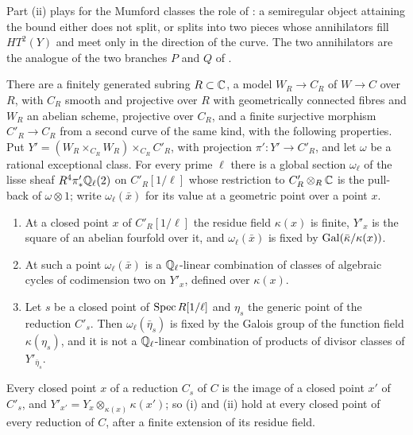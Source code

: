 Part (ii) plays for the Mumford classes the role of : a
semiregular object attaining the bound either does not split, or splits into
two pieces whose annihilators fill $HT^{2}(Y)$ and meet only in the direction
of the curve. The two annihilators are the analogue of the two branches $P$
and $Q$ of .

\begin{proposition}
\label{prop:modp}
There are a finitely generated subring $R\subset\mathbb{C}$, a model $W_{R}\to
C_{R}$ of $W\to C$ over $R$, with $C_{R}$ smooth and projective over $R$ with
geometrically connected fibres and $W_{R}$ an abelian scheme, projective over
$C_{R}$, and a finite surjective morphism $C'_{R}\to C_{R}$ from a second curve of the same
kind, with the following properties. Put $Y'=(W_{R}\times_{C_{R}}W_{R})
\times_{C_{R}}C'_{R}$, with projection $\pi'\colon Y'\to C'_{R}$, and let
$\omega$ be a rational exceptional class. For every prime $\ell$ there is a
global section $\omega_{\ell}$ of the lisse sheaf
$R^{4}\pi'_{*}\mathbb{Q}_{\ell}(2)$ on $C'_{R}[1/\ell]$ whose restriction to
$C'_{R}\otimes_{R}\mathbb{C}$ is the pull-back of $\omega\otimes1$; write
$\omega_{\ell}(\bar{x})$ for its value at a geometric point over a point $x$.
\begin{enumerate}[label=\textup{(\roman*)},leftmargin=2.6em,itemsep=2pt]
\item At a closed point $x$ of $C'_{R}[1/\ell]$ the residue field
  $\kappa(x)$ is finite, $Y'_{x}$ is the square of an abelian fourfold over
  it, and $\omega_{\ell}(\bar{x})$ is fixed by $\operatorname{Gal}(\bar{\kappa}/\kappa(x))$.
\item At such a point $\omega_{\ell}(\bar{x})$ is a $\mathbb{Q}_{\ell}$-linear
  combination of classes of algebraic cycles of codimension two on $Y'_{x}$,
  defined over $\kappa(x)$.
\item Let $s$ be a closed point of $\operatorname{Spec} R[1/\ell]$ and $\eta_{s}$ the generic
  point of the reduction $C'_{s}$. Then $\omega_{\ell}(\bar\eta_{s})$ is fixed
  by the Galois group of the function field $\kappa(\eta_{s})$, and it is not
  a $\mathbb{Q}_{\ell}$-linear combination of products of divisor classes of
  $Y'_{\bar\eta_{s}}$.
\end{enumerate}
Every closed point $x$ of a reduction $C_{s}$ of $C$ is the image of a closed
point $x'$ of $C'_{s}$, and $Y'_{x'}=Y_{x}\otimes_{\kappa(x)}\kappa(x')$; so
(i) and (ii) hold at every closed point of every reduction of $C$, after a
finite extension of its residue field.
\end{proposition}

